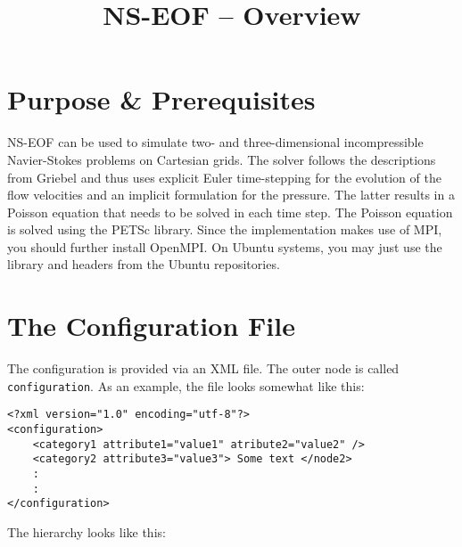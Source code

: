 \documentclass[pdftex,A4]{article}
\begin{document}
\title{NS-EOF -- Overview}
\maketitle

\section{Purpose \& Prerequisites}
NS-EOF can be used to simulate two- and three-dimensional incompressible Navier-Stokes problems on Cartesian grids.
The solver follows the descriptions from Griebel and thus uses explicit Euler time-stepping for the evolution of
the flow velocities and an implicit formulation for the pressure.
The latter results in a Poisson equation that needs to be solved in each time step.
The Poisson equation is solved using the PETSc library.
Since the implementation makes use of MPI, you should further install OpenMPI.
On Ubuntu systems, you may just use the library and headers from the Ubuntu repositories.

\section{The Configuration File}\label{sec:the_configuration_file}

The configuration is provided via an XML file. The outer node is called {\tt configuration}. As an example, the file looks somewhat like this:

\begin{verbatim}
<?xml version="1.0" encoding="utf-8"?>
<configuration>
    <category1 attribute1="value1" atribute2="value2" />
    <category2 attribute3="value3"> Some text </node2>
    :
    :
</configuration>
\end{verbatim}

The hierarchy looks like this:
\end{document}
